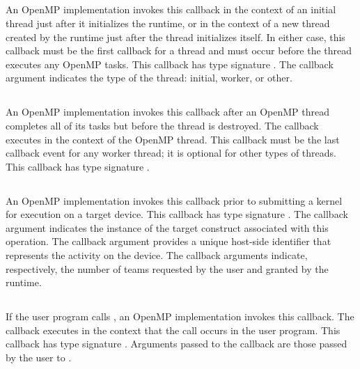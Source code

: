 \subsection{}
An OpenMP implementation invokes this callback in the context of an initial thread just after it initializes the runtime, or in the context of a new thread created by the runtime just after the thread initializes itself. In either case, this callback must be the first callback for a thread
and must occur before the thread executes any OpenMP tasks. This callback has type signature .
The callback argument  indicates the type of the thread: initial, worker, or other.

\subsection{}
An OpenMP implementation invokes this callback
after an OpenMP thread completes all of
its tasks but before the thread is destroyed. The callback
executes in the context of the OpenMP thread. This callback must be the last callback event for any worker thread; it is optional for other types of threads.
This callback has type signature .

\subsection{}

An OpenMP implementation invokes this callback prior to submitting a kernel for execution on a target device.
This callback has type signature .
The callback argument  indicates the instance of the target construct associated with this operation.
The callback argument  provides a unique host-side identifier that represents the activity on the device.
The callback arguments    indicate, respectively, the number of teams requested by the user and granted by the runtime.

\subsection{}
\label{subsec:ompt_event_control}
If the user program calls , an
OpenMP implementation invokes this callback.
The callback executes in the context that the call occurs in the user program.
This callback has type signature .
Arguments passed to the callback are those passed by the user to .

